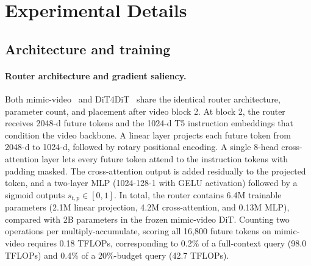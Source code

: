 
\section{Experimental Details}
\label{app:exp_details}




\subsection{Architecture and training}
\label{app:supp_formulation}

\paragraph{Router architecture and gradient saliency.}
    Both mimic-video~\cite{pai2025mimicvideo} and DiT4DiT~\cite{ma2026dit4dit} share the identical router architecture, parameter count, and placement after video block 2.
    At block 2, the router receives 2048-d future tokens and the 1024-d T5 instruction embeddings that condition the video backbone.
    A linear layer projects each future token from 2048-d to 1024-d, followed by rotary positional encoding.
    A single 8-head cross-attention layer lets every future token attend to the instruction tokens with padding masked.
    The cross-attention output is added residually to the projected token, and a two-layer MLP (1024-128-1 with GELU activation) followed by a sigmoid outputs $s_{t,p} \in [0, 1]$.
    In total, the router contains 6.4M trainable parameters (2.1M linear projection, 4.2M cross-attention, and 0.13M MLP), compared with 2B parameters in the frozen mimic-video DiT.
    Counting two operations per multiply-accumulate, scoring all 16,800 future tokens on mimic-video requires 0.18 TFLOPs, corresponding to 0.2\% of a full-context query (98.0 TFLOPs) and 0.4\% of a 20\%-budget query (42.7 TFLOPs).

